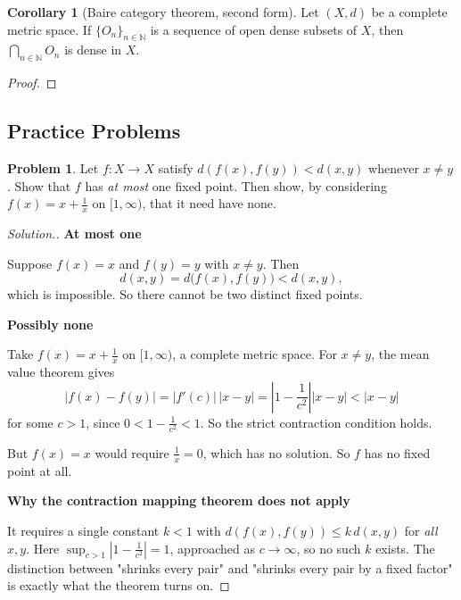 \documentclass[11pt,a4paper]{article}
\theoremstyle{definition}
\newtheorem{coro}[thm]{Corollary}
\newtheorem{problemx}{Problem}[section]
\newenvironment{problem}{\begin{problemx}}{\end{problemx}}
\newenvironment{solution}
  {\renewcommand{\qedsymbol}{}\begin{proof}[\textit{Solution}.]}
  {\end{proof}}
\newcommand{\subhead}[1]{%
  \par\medskip\noindent\textbf{#1}\par\nobreak\smallskip}
\begin{document}
\begin{coro}[Baire category theorem, second form]
Let $(X,d)$ be a complete metric space. If $\{O_n\}_{n\in \mathbb{N}}$ is a sequence of open dense subsets of $X$, then $\bigcap_{n\in \mathbb{N}}O_n$ is dense in $X$.
\end{coro}

\begin{proof}


\pagebreak
\end{proof}
\subsection{Practice Problems}

\begin{problem}
Let $f:X\rightarrow X$ satisfy $d(f(x),f(y))<d(x,y)$ whenever $x\neq y$. Show
that $f$ has \emph{at most} one fixed point. Then show, by considering
$f(x)=x+\frac{1}{x}$ on $[1,\infty)$, that it need have none.
\end{problem}
\begin{solution}
\subhead{At most one}
Suppose $f(x)=x$ and $f(y)=y$ with $x\neq y$. Then
$$d(x,y)=d\big(f(x),f(y)\big)<d(x,y),$$
which is impossible. So there cannot be two distinct fixed points.

\subhead{Possibly none}
Take $f(x)=x+\frac1x$ on $[1,\infty)$, a complete metric space. For $x\neq y$,
the mean value theorem gives
$$|f(x)-f(y)|=|f'(c)|\,|x-y|=\left|1-\frac{1}{c^2}\right||x-y|<|x-y|$$
for some $c>1$, since $0<1-\frac{1}{c^2}<1$. So the strict contraction
condition holds.

But $f(x)=x$ would require $\frac1x=0$, which has no solution. So $f$ has no
fixed point at all.

\subhead{Why the contraction mapping theorem does not apply}
It requires a single constant $k<1$ with $d(f(x),f(y))\leq k\,d(x,y)$ for
\emph{all} $x,y$. Here $\sup_{c>1}\left|1-\frac{1}{c^2}\right|=1$, approached as
$c\rightarrow\infty$, so no such $k$ exists. The distinction between "shrinks
every pair" and "shrinks every pair by a fixed factor" is exactly what the
theorem turns on.
\end{solution}
\end{document}
